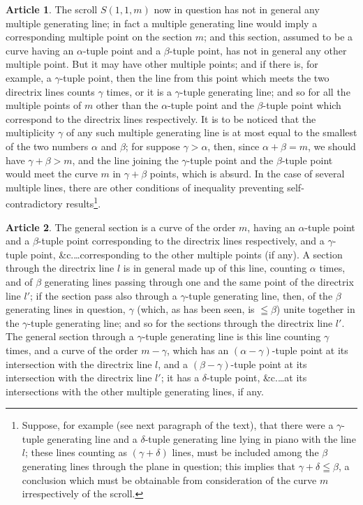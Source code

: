 \documentclass[12pt,a4paper]{article}
\theoremstyle{definition}
\newtheorem{art}{Article}[section]
\begin{document}
\begin{art}
The scroll $S(1, 1, m)$ now in question has not in general any multiple generating line; in fact a multiple generating line would imply a corresponding multiple point on the section $m$; and this section, assumed to be a curve having an $\alpha$-tuple point and a $\beta$-tuple point, has not in general any other multiple point. But it may have other multiple points; and if there is, for example, a $\gamma$-tuple point, then the line from this point which meets the two directrix lines counts $\gamma$ times, or it is a $\gamma$-tuple generating line; and so for all the multiple points of $m$ other than the $\alpha$-tuple point and the $\beta$-tuple point which correspond to the directrix lines respectively. It is to be noticed that the multiplicity $\gamma$ of any such multiple generating line is at most equal to the smallest of the two numbers $\alpha$ and $\beta$; for suppose $\gamma > \alpha$, then, since $\alpha + \beta = m$, we should have $\gamma + \beta > m$, and the line joining the $\gamma$-tuple point and the $\beta$-tuple point would meet the curve $m$ in $\gamma + \beta$ points, which is absurd. In the case of several multiple lines, there are other conditions of inequality preventing self-contradictory results\footnote{Suppose, for example (see next paragraph of the text), that there were a $\gamma$-tuple generating line and a $\delta$-tuple generating line lying in piano with the line $l$; these lines counting as $(\gamma + \delta)$ lines, must be included among the $\beta$ generating lines through the plane in question; this implies that $\gamma + \delta \leqq \beta$, a conclusion which must be obtainable from consideration of the curve $m$ irrespectively of the scroll.}.
\end{art}

\begin{art}
The general section is a curve of the order $m$, having an $\alpha$-tuple point and a $\beta$-tuple point corresponding to the directrix lines respectively, and a $\gamma$-tuple point, \&c.\ldots corresponding to the other multiple points (if any). A section through the directrix line $l$ is in general made up of this line, counting $\alpha$ times, and of $\beta$ generating lines passing through one and the same point of the directrix line $l'$; if the section pass also through a $\gamma$-tuple generating line, then, of the $\beta$ generating lines in question, $\gamma$ (which, as has been seen, is $\leqq \beta$) unite together in the $\gamma$-tuple generating line; and so for the sections through the directrix line $l'$. The general section through a $\gamma$-tuple generating line is this line counting $\gamma$ times, and a curve of the order $m - \gamma$, which has an $(\alpha - \gamma)$-tuple point at its intersection with the directrix line $l$, and a $(\beta - \gamma)$-tuple point at its intersection with the directrix line $l'$; it has a $\delta$-tuple point, \&c.\ldots at its intersections with the other multiple generating lines, if any.
\end{art}
\end{document}
